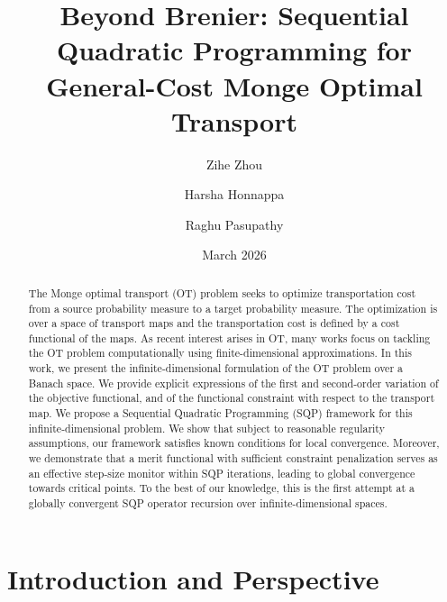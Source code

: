 \documentclass[12pt,leqno]{amsart}
\begin{document}
\title[SQP for Optimal Transport]{Beyond Brenier: Sequential Quadratic Programming for General-Cost Monge Optimal Transport}
\author{Zihe Zhou \and Harsha Honnappa \and Raghu Pasupathy}
\date{March 2026}
\address{315 N Grant St, West Lafayette, IN 47907-2023, United States}
\maketitle
\let\thefootnote\relax
{} %

\begin{abstract}
  The Monge optimal transport (OT) problem seeks to optimize transportation cost from a source probability measure to a target probability measure. The optimization is over a space of transport maps and the transportation cost is defined by a cost functional of the maps. As recent interest arises in OT, many works focus on tackling the OT problem computationally using finite-dimensional approximations. In this work, we present the infinite-dimensional formulation of the OT problem over a Banach space. We provide explicit expressions of the first and second-order variation of the objective functional, and of the functional constraint with respect to the transport map. We propose a Sequential Quadratic Programming (SQP) framework for this infinite-dimensional problem. We show that subject to reasonable regularity assumptions, our framework satisfies known conditions for local convergence. Moreover, we demonstrate that a merit functional with sufficient constraint penalization serves as an effective step-size monitor within SQP iterations, leading to global convergence towards critical points. To the best of our knowledge, this is the first attempt at a globally convergent SQP operator recursion over infinite-dimensional spaces.
\end{abstract} %

\bigskip


\section{Introduction and Perspective}
\end{document}
